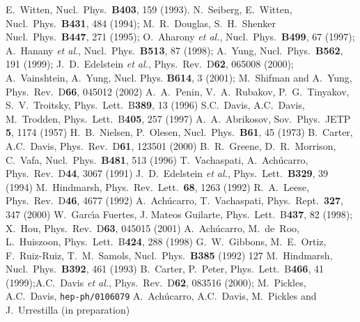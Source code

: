 \documentclass[a4paper,aps,prd,superscriptaddress,floats]{revtex4}
\begin{document}
\begin{thebibliography}{}
 E.~Witten, Nucl.~Phys.~{\bf B403}, 159 (1993). 
 N.~Seiberg, E.~Witten, Nucl.~Phys.~{\bf B431}, 484 (1994);
 M.~R.~Douglas, S.~H.~Shenker Nucl.~Phys.~{\bf B447}, 271 (1995); 
O.~Aharony {\slshape et al.}, Nucl.~Phys.~{\bf B499}, 67 (1997);
A.~Hanany {\slshape et al.}, Nucl.~Phys.~{\bf B513}, 87 (1998);
A.~Yung, Nucl.~Phys.~{\bf B562}, 191 (1999);
J.~D.~Edelstein {\slshape et al.}, Phys.~Rev.~D{\bf 62}, 065008 (2000);
A.~Vainshtein, A.~Yung, Nucl. Phys. {\bf B614}, 3 (2001); M.~Shifman and A.~Yung, Phys.~Rev.~D{\bf 66}, 045012 (2002)
A.~A.~Penin, V.~A.~Rubakov, P.~G.~Tinyakov, S.~V.~Troitsky, 
Phys.~Lett.~B{\bf 389}, 13 (1996)
 S.C.~Davis, A.C.~Davis, M.~Trodden, Phys.~Lett.~B{\bf 405}, 257  (1997) 
A.~A.~Abrikosov, Sov.~Phys.~JETP {\bf 5}, 1174 (1957) 
H.~B.~Nielsen, P.~Olesen, Nucl.~Phys.~{\bf B61}, 45 (1973)
B.~Carter, A.C.~Davis, Phys.~Rev.~D{\bf 61}, 123501 (2000) 
B.~R.~Greene, D.~R.~Morrison, C.~Vafa, 
        Nucl.~Phys.~{\bf B481}, 513 (1996) 
T.~Vachaspati, A.~Ach\'{u}carro, Phys.~Rev.~D{\bf 44}, 3067
        (1991)
J.~D.~Edelstein {\slshape et al.}, Phys.~Lett.~{\bf B329}, 39 (1994)
M.~Hindmarsh, Phys.~Rev.~Lett.~{\bf 68}, 1263 (1992)
R.~A.~Leese,  Phys.~Rev.~D{\bf 46}, 4677 (1992)
 A.~Ach\'ucarro, T.~Vachaspati, Phys.~Rept.~{\bf 327}, 347 (2000)
 W.~Garc\'\i a Fuertes, J. Mateos Guilarte, Phys.~Lett.~B{\bf 437}, 82 (1998);
X.~Hou, Phys.~Rev.~D{\bf 63}, 045015 (2001)
A.~Ach\'ucarro, M.~de~Roo, L.~Huiszoon, Phys.~Lett.~B{\bf 424}, 288 (1998)
G.~W.~Gibbons, M.~E.~Ortiz, F.~Ruiz-Ruiz, T.~M.~Samols, 
        Nucl.~Phys.~{\bf B385} (1992) 127
M.~Hindmarsh, Nucl.~Phys.~{\bf B392}, 461 (1993) 
B.~Carter, P.~Peter, Phys.~Lett.~B{\bf 466},
41 (1999);A.C.~Davis {\slshape et al.}, Phys.~Rev.~D{\bf 62}, 083516 (2000); 
M.~Pickles, A.C.~Davis, {\tt hep-ph/0106079}
 A.~Ach\'ucarro, A.C.~Davis, M.~Pickles and J.~Urrestilla (in preparation)
\end{thebibliography}
\end{document}
